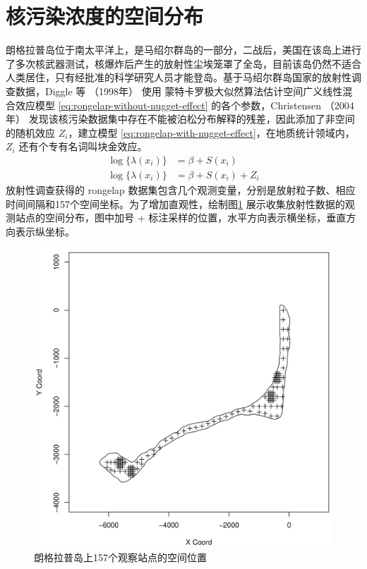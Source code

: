 \documentclass[12pt,a4paper,UTF8,twoside]{book}
\theoremstyle{definition}
\theoremstyle{definition}
\theoremstyle{definition}
\theoremstyle{remark}
\begin{document}
\hypertarget{case-rongelap}{%
\section{核污染浓度的空间分布}\label{case-rongelap}}

朗格拉普岛位于南太平洋上，是马绍尔群岛的一部分，二战后，美国在该岛上进行了多次核武器测试，核爆炸后产生的放射性尘埃笼罩了全岛，目前该岛仍然不适合人类居住，只有经批准的科学研究人员才能登岛。基于马绍尔群岛国家的放射性调查数据，Diggle 等 （1998年） \citep{Diggle1998} 使用 蒙特卡罗极大似然算法估计空间广义线性混合效应模型 \eqref{eq:rongelap-without-nugget-effect} 的各个参数，Christensen （2004年） \citep{Christensen2004} 发现该核污染数据集中存在不能被泊松分布解释的残差，因此添加了非空间的随机效应 \(Z_i\)，建立模型 \eqref{eq:rongelap-with-nugget-effect}，在地质统计领域内，\(Z_i\) 还有个专有名词叫块金效应。
\begin{align}
\log\{\lambda(x_{i})\}& =  \beta + S(x_{i}) \label{eq:rongelap-without-nugget-effect}\\
\log\{\lambda(x_{i})\}& =  \beta + S(x_{i}) + Z_{i} \label{eq:rongelap-with-nugget-effect}
\end{align}
放射性调查获得的 rongelap 数据集包含几个观测变量，分别是放射粒子数、相应时间间隔和157个空间坐标。为了增加直观性，绘制图\ref{fig:rongelap-dataset} 展示收集放射性数据的观测站点的空间分布，图中加号 + 标注采样的位置，水平方向表示横坐标，垂直方向表示纵坐标。

\begin{figure}

{\centering \includegraphics[width=0.65\linewidth]{figures/rongelap-island} 

}

\caption{朗格拉普岛上157个观察站点的空间位置}\label{fig:rongelap-dataset}
\end{figure}
\end{document}
